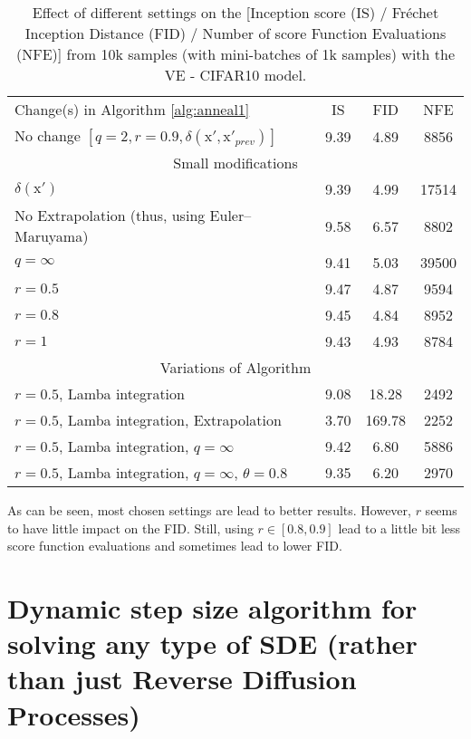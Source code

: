 \documentclass{article}
\newcommand{\x}{\boldsymbol{\mathrm{x}}}
\begin{document}
\begin{table}[!ht]
	\caption{Effect of different settings on the [Inception score (IS) / Fréchet Inception Distance (FID) / Number of score Function Evaluations (NFE)] from 10k samples (with mini-batches of 1k samples) with the VE - CIFAR10 model.}
	\label{tab:table2b}
	\centering
	\begin{tabular}{lccc}
		\toprule
		Change(s) in Algorithm \ref{alg:anneal1} & IS & FID & NFE \\
		\cmidrule(){1-4}
	    No change $\left[ q=2, r=0.9, \delta(\x',\x'_{prev})\right]$ & 9.39 & 4.89 & 8856 \\
	    \cmidrule(){1-4}
	    \multicolumn{4}{c}{Small modifications} \\
	    \cmidrule(){1-4}
	   $\delta(\x')$ & 9.39 & 4.99 & 17514 \\
	    No Extrapolation (thus, using Euler–Maruyama) & 9.58 & 6.57 & 8802 \\
	    $q=\infty$ & 9.41 & 5.03 & 39500 \\
	    $r=0.5$ & 9.47 & 4.87 & 9594 \\
	    $r=0.8$ & 9.45 & 4.84 & 8952 \\
	    $r=1$  & 9.43 & 4.93 & 8784 \\
	    \cmidrule(){1-4}
	    \multicolumn{4}{c}{Variations of \citet{lamba2003adaptive} Algorithm}\\
	    \cmidrule(){1-4}
	   $r=0.5$, Lamba integration & 9.08 & 18.28 & 2492 \\
	   $r=0.5$, Lamba integration, Extrapolation & 3.70 & 169.78 & 2252 \\
	   $r=0.5$, Lamba integration, $q=\infty$ & 9.42 & 6.80 & 5886 \\
	   $r=0.5$, Lamba integration, $q=\infty$, $\theta=0.8$ & 9.35 & 6.20 & 2970 \\
		\bottomrule
	\end{tabular}
\end{table}

As can be seen, most chosen settings are lead to better results. However, $r$ seems to have little impact on the FID. Still, using $r \in [0.8, 0.9]$ lead to a little bit less score function evaluations and sometimes lead to lower FID.

\clearpage

\section{Dynamic step size algorithm for solving any type of SDE (rather than just Reverse Diffusion Processes)}\label{sec:myalg}
\end{document}
